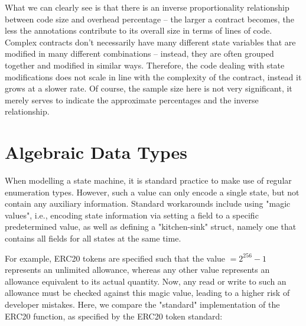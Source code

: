 What we can clearly see is that there is an inverse proportionality relationship between code size and overhead percentage -- the larger a contract becomes, the less the annotations contribute to its overall size in terms of lines of code. Complex contracts don't necessarily have many different state variables that are modified in many different combinations -- instead, they are often grouped together and modified in similar ways. Therefore, the code dealing with state modifications does not scale in line with the complexity of the contract, instead it grows at a slower rate. Of course, the sample size here is not very significant, it merely serves to indicate the approximate percentages and the inverse relationship.





\section{Algebraic Data Types}
When modelling a state machine, it is standard practice to make use of regular enumeration types. However, such a value can only encode a single state, but not contain any auxiliary information. Standard workarounds include using "magic values", i.e., encoding state information via setting a field to a specific predetermined value, as well as defining a "kitchen-sink" struct, namely one that contains all fields for all states at the same time.
\par
For example, ERC20 tokens are specified such that the value  $= 2^{256}-1$ represents an unlimited allowance, whereas any other value represents an allowance equivalent to its actual quantity. Now, any read or write to such an allowance must be checked against this magic value, leading to a higher risk of developer mistakes. Here, we compare the "standard" implementation of the ERC20  function, as specified by the ERC20 token standard:

